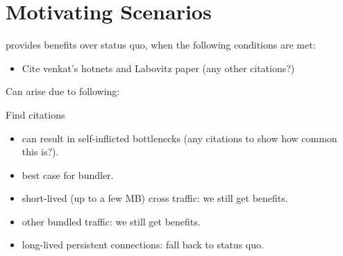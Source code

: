 \section{Motivating Scenarios}
\label{s:deploy}


\name provides benefits over status quo, when the following conditions are met:

\begin{itemize}
    \item Cite venkat's hotnets and Labovitz paper (any other citations?)
\end{itemize}

Can arise due to following:

Find citations
\begin{itemize}
    \item can result in self-inflicted bottlenecks (any citations to show how common this is?).
    \item best case for bundler.
\end{itemize}

\begin{itemize}
    \item short-lived (up to a few MB) cross traffic: we still get benefits.
    \item other bundled traffic: we still get benefits.
    \item long-lived persistent connections: fall back to status quo.
\end{itemize}


\radhika{*/}